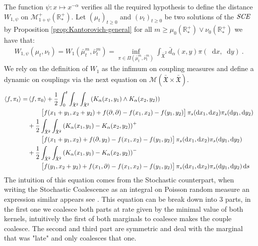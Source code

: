\documentclass[11pt,a4paper]{article}
\newcommand{\RRP}{\mathbb{R}^+_*}
\newcommand{\MC}{\mathcal{M}}
\newcommand{\XF}{\mathfrak{X}}
\newcommand{\SCE}{\emph{SCE}}
\newcommand{\Proc}[1]{\left(#1\right)_{t\geq 0}}
\newcommand{\brac}[1]{\left\langle#1\right\rangle}
\newcommand{\dd}{\mathop{}\!\mathrm{d}}
\begin{document}
The function $\psi : x \mapsto x^{-\alpha}$ verifies all the required hypothesis to define the distance $W_{1,\psi}$ on $\MC^+_{1 + \psi}(\RRP)$. Let $\Proc{\mu_t}$ and $\Proc{\nu_t}$ be two solutions of the $\SCE$ by Proposition \ref{prop:Kantorovich-general} for all $m \geq \mu_0(\RRP) \vee \nu_0(\RRP)$ we have that:
\begin{align*}
    W_{1,\psi}(\mu_t,\nu_t) = W_1\left(\bar{\mu}^m_t,\bar{\nu}^m_t \right) = \inf_{\pi \in \Pi(\bar{\mu}^m_t,\bar{\nu}^m_t)} \int_{\bar{\XF}^2} \bar{d}_\alpha(x,y) \pi(\dd x, \dd y)\ .
\end{align*}
We rely on the definition of $W_1$ as the infimum on coupling measures and define a dynamic on couplings via the next equation on $\MC(\bar{\XF}\times \bar{\XF})$.
\begin{align*}
\brac{f,\pi_t} =& \brac{f,\pi_0} + \dfrac12\int_0^t \int_{\bar{\XF}^2} \int_{\bar{\XF}^2}\left(K_\alpha(x_1,y_1)\wedge K_\alpha(x_2,y_2) \right) \\
    &\qquad  \left[f(x_1+y_1,x_2+y_2) + f(\partial,\partial)- f(x_1,x_2) -f(y_1,y_2) \vphantom{A^2} \right]\pi_s(\dd x_1,\dd x_2)\pi_s(\dd y_1,\dd y_2)\\
    &+ \dfrac12\int_{\bar{\XF}^2}\int_{\bar{\XF}^2} \left(K_\alpha(x_1,y_1)- K_\alpha(x_2,y_2) \right)^+ \\
    &\qquad\left[f(x_1+y_1,x_2) + f(\partial,y_2)- f(x_1,x_2) -f(y_1,y_2) \vphantom{A^2} \right]\pi_s(\dd x_1,\dd x_2)\pi_s(\dd y_1,\dd y_2)\\
    &+ \dfrac12\int_{\bar{\XF}^2}\int_{\bar{\XF}^2} \left(K_\alpha(x_1,y_1)- K_\alpha(x_2,y_2) \right)^-\\
    &\qquad\left[f(y_1,x_2 + y_2) + f(x_1,\partial)- f(x_1,x_2) -f(y_1,y_2) \vphantom{A^2} \right]\pi_s(\dd x_1,\dd x_2)\pi_s(\dd y_1,\dd y_2) \dd s
\end{align*}
The intuition of this equation comes from the Stochastic counterpart, when writing the Stochastic Coalescence as an  integral on Poisson random measure an expression similar appears see \cite{fournier2004convergence}. This equation can be break down into $3$ parts, in the first one we coalesce both parts at rate given by the minimal value of both kernels, intuitively the first of both marginals to coalesce makes the couple coalesce. The second and third part are symmetric and deal with the marginal that was "late" and only coalesces that one.

\newpage
\end{document}
